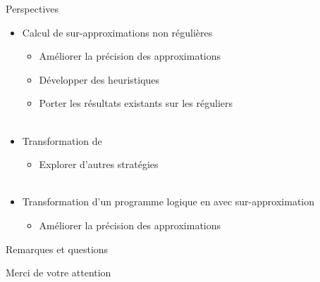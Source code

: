 \documentclass[xcolor={dvipsnames}]{beamer}
\begin{document}
\begin{frame}{Perspectives}
  \begin{itemize}[<+->]
  \item Calcul de sur-approximations non régulières
    \begin{itemize}
    \item Améliorer la précision des approximations
    \item Développer des heuristiques
    \item Porter les résultats existants sur les réguliers\\~
    \end{itemize}
  \item Transformation de \pctrs
    \begin{itemize}
      \item Explorer d'autres stratégies\\~
    \end{itemize}
  \item Transformation d'un programme logique en \csprogramme avec sur-approximation
    \begin{itemize}
    \item Améliorer la précision des approximations
    \end{itemize}
  \end{itemize}
\end{frame}

\begin{frame}{Remarques et questions}
  \begin{center}
    Merci de votre attention
  \end{center}
\end{frame}
\end{document}
